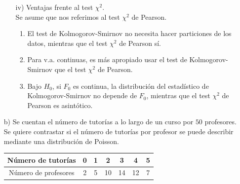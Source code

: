 \documentclass[12pt]{article}
\begin{document}
\begin{ejercicio}
\begin{enumerate}
\begin{enumerate}
                \item[iv)] Ventajas frente al test $\chi^2$. \\
                
                Se asume que nos referimos al test $\chi^2$ de Pearson. \\
                \begin{enumerate}
                    \item El test de Kolmogorov-Smirnov no necesita hacer particiones de los datos, mientras que el test $\chi^2$ de Pearson sí.
                    \item Para v.a. continuas, es más apropiado usar el test de Kolmogorov-Smirnov que el test $\chi^2$ de Pearson.
                    \item Bajo $H_0$, si $F_0$ es continua, la distribución del estadístico de Kolmogorov-Smirnov no depende de $F_0$, mientras
                    que el test $\chi^2$ de Pearson es asintótico.
                \end{enumerate}

            \end{enumerate}
            \item[b)] Se cuentan el número de tutorías a lo largo de un curso por $50$ profesores.
            Se quiere contrastar si el número de tutorías por profesor se puede describir
            mediante una distribución de Poisson.

            \begin{center}
                \begin{tabular}{c|cccccc}
                    Número de tutorías   & 0 & 1 &  2 & 3  & 4  & 5 \\ \hline
                    Número de profesores & 2 & 5 & 10 & 14 & 12 & 7
                \end{tabular}
            \end{center}


\end{enumerate}
\end{ejercicio}
\end{document}
